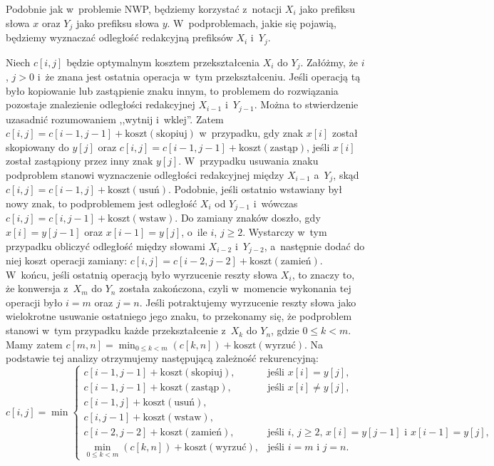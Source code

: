 
\subproblem %
Podobnie jak w~problemie NWP, będziemy korzystać z~notacji $X_i$ jako  prefiksu słowa $x$ oraz $Y_j$ jako  prefiksu słowa $y$.
W~podproblemach, jakie się pojawią, będziemy wyznaczać odległość redakcyjną prefiksów $X_i$ i~$Y_j$.

Niech $c[i,j]$ będzie optymalnym kosztem przekształcenia $X_i$ do $Y_j$.
Załóżmy, że $i$, $j>0$ i~że znana jest ostatnia operacja w~tym przekształceniu.
Jeśli operacją tą było kopiowanie lub zastąpienie znaku innym, to problemem do rozwiązania pozostaje znalezienie odległości redakcyjnej $X_{i-1}$ i~$Y_{j-1}$.
Można to stwierdzenie uzasadnić rozumowaniem ,,wytnij i~wklej''.
Zatem $c[i,j]=c[i-1,j-1]+\mathrm{koszt}(\text{skopiuj})$ w~przypadku, gdy znak $x[i]$ został skopiowany  do $y[j]$ oraz $c[i,j]=c[i-1,j-1]+\mathrm{koszt}(\text{zastąp})$, jeśli $x[i]$ został zastąpiony przez inny znak $y[j]$.
W~przypadku usuwania znaku podproblem stanowi wyznaczenie odległości redakcyjnej między $X_{i-1}$ a~$Y_j$, skąd $c[i,j]=c[i-1,j]+\mathrm{koszt}(\text{usuń})$.
Podobnie, jeśli ostatnio wstawiany był nowy znak, to podproblemem jest odległość $X_i$ od $Y_{j-1}$ i~wówczas $c[i,j]=c[i,j-1]+\mathrm{koszt}(\text{wstaw})$.
Do zamiany znaków doszło, gdy $x[i]=y[j-1]$ oraz $x[i-1]=y[j]$, o~ile $i$, $j\ge2$.
Wystarczy w~tym przypadku obliczyć odległość między słowami $X_{i-2}$ i~$Y_{j-2}$, a~następnie dodać do niej koszt operacji zamiany: $c[i,j]=c[i-2,j-2]+\mathrm{koszt}(\text{zamień})$.
W~końcu, jeśli ostatnią operacją było wyrzucenie reszty słowa $X_i$, to znaczy to, że konwersja z~$X_m$ do $Y_n$ została zakończona, czyli w~momencie wykonania tej operacji było $i=m$ oraz $j=n$.
Jeśli potraktujemy wyrzucenie reszty słowa jako wielokrotne usuwanie ostatniego jego znaku, to przekonamy się, że podproblem stanowi w~tym przypadku każde przekształcenie z~$X_k$ do $Y_n$, gdzie $0\le k<m$.
Mamy zatem $c[m,n]=\min_{0\le k<m}(c[k,n])+\mathrm{koszt}(\text{wyrzuć})$.
Na podstawie tej analizy otrzymujemy następującą zależność rekurencyjną:
\[
	c[i,j] = \min\begin{cases}
		c[i-1,j-1]+\mathrm{koszt}(\text{skopiuj}), & \text{jeśli $x[i]=y[j]$}, \\
		c[i-1,j-1]+\mathrm{koszt}(\text{zastąp}), & \text{jeśli $x[i]\ne y[j]$}, \\
		c[i-1,j]+\mathrm{koszt}(\text{usuń}), \\
		c[i,j-1]+\mathrm{koszt}(\text{wstaw}), \\
		c[i-2,j-2]+\mathrm{koszt}(\text{zamień}), & \text{jeśli $i$, $j\ge2$, $x[i]=y[j-1]$ i~$x[i-1]=y[j]$}, \\
		\displaystyle\min_{0\le k<m}(c[k,n])+\mathrm{koszt}(\text{wyrzuć}), & \text{jeśli $i=m$ i~$j=n$}.
	\end{cases}
\]

